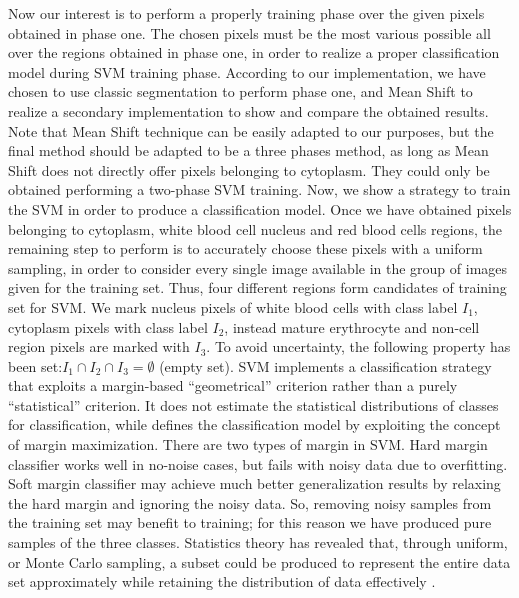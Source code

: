 \documentclass[final,a4paper,12pt,english]{UnicaPhdThesis3}
\begin{document}
	Now our interest is to perform a properly training phase over the given pixels obtained in phase one. The chosen pixels must be the most various possible all over the regions obtained in phase one, in order to realize a proper classification model during SVM training phase. 
	According to our implementation, we have chosen to use classic segmentation to perform phase one, and Mean Shift to realize a secondary implementation to show and compare the obtained results. Note that Mean Shift technique can be easily adapted to our purposes, but the final method should be adapted to be a three phases method, as long as Mean Shift does not directly offer pixels belonging to cytoplasm. They could only be obtained performing a two-phase SVM training. 
	Now, we show a strategy to train the SVM in order to produce a classification model. Once we have obtained pixels belonging to cytoplasm, white blood cell nucleus and red blood cells regions, the remaining step to perform is to accurately choose these pixels with a uniform sampling, in order to consider every single image available in the group of images given for the training set.
	Thus, four different regions form candidates of training set for SVM. We mark nucleus pixels of white blood cells with class label $I_1$, cytoplasm pixels with class label $I_2$, instead mature erythrocyte and non-cell region pixels are marked with $I_3$. To avoid uncertainty, the following property has been set:$ I_1\cap I_2 \cap I_3 = \emptyset$ (empty set). SVM implements a classification strategy that exploits a margin-based “geometrical” criterion rather than a purely “statistical” criterion. It does not estimate the statistical distributions of classes for classification, while defines the classification model by exploiting the concept of margin maximization. There are two types of margin in SVM. Hard margin classifier works well in no-noise cases, but fails with noisy data due to overfitting. Soft margin classifier may achieve much better generalization results by relaxing the hard margin and ignoring the noisy data. So, removing noisy samples from the training set may benefit to training; for this reason we have produced pure samples of the three classes. Statistics theory has revealed that, through uniform, or Monte Carlo sampling, a subset could be produced to represent the entire data set approximately while retaining the distribution of data effectively \cite{caflisch}.
\end{document}
